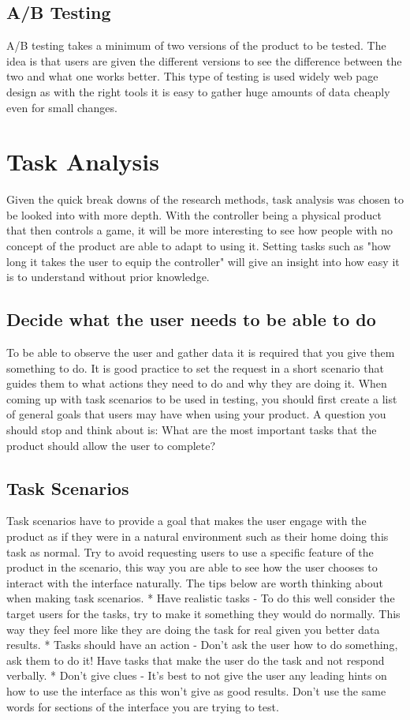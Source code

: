 \documentclass{scrartcl}
\begin{document}
	\subsection{A/B Testing}
		A/B testing takes a minimum of two versions of the product to be tested. The idea is that users are given the different versions to see the difference between the two and what one works better. This type of testing is used widely web page design\citep{azevedo2018b} as with the right tools it is easy to gather huge amounts of data cheaply even for small changes.
		
	\section{Task Analysis}
		Given the quick break downs of the research methods, task analysis was chosen to be looked into with more depth. With the controller being a physical product that then controls a game, it will be more interesting to see how people with no concept of the product are able to adapt to using it. Setting tasks such as "how long it takes the user to equip the controller" will give an insight into how easy it is to understand without prior knowledge.
		
	\subsection{Decide what the user needs to be able to do}
		To be able to observe the user and gather data it is required that you give them something to do. It is good practice to set the request in a short scenario that guides them to what actions they need to do and why they are doing it. When coming up with task scenarios to be used in testing, you should first create a list of general goals that users may have when using your product. A question you should stop and think about is: What are the most important tasks that the product should allow the user to complete?\citep{nielsen_norman_tognazzini_2018}
	
	\subsection{Task Scenarios}
		Task scenarios have to provide a goal that makes the user engage with the product as if they were in a natural environment such as their home doing this task as normal. Try to avoid requesting users to use a specific feature of the product in the scenario, this way you are able to see how the user chooses to interact with the interface naturally. The tips below are worth thinking about when making task scenarios.\citep{nielsen_norman_tognazzini_2018}
		* Have realistic tasks - To do this well consider the target users for the tasks, try to make it something they would do normally. This way they feel more like they are doing the task for real given you better data results.
		* Tasks should have an action - Don't ask the user how to do something, ask them to do it! Have tasks that make the user do the task and not respond verbally.
		* Don't give clues - It's best to not give the user any leading hints on how to use the interface as this won't give as good results. Don't use the same words for sections of the interface you are trying to test.
\end{document}

